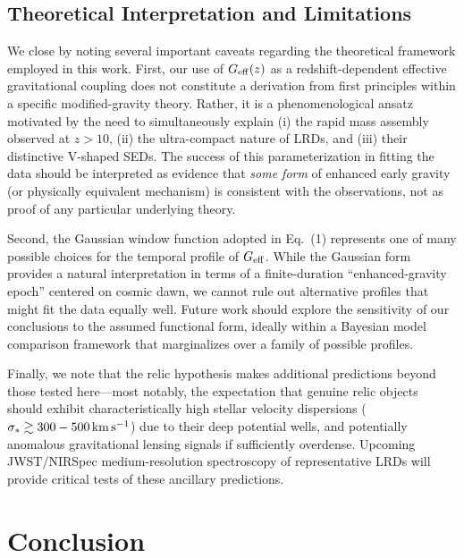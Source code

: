\documentclass[twocolumn]{aastex631}
\begin{document}
\subsection{Theoretical Interpretation and Limitations}

We close by noting several important caveats regarding the theoretical framework employed in this work. First, our use of $G_{\rm eff}(z)$ as a redshift-dependent effective gravitational coupling does not constitute a derivation from first principles within a specific modified-gravity theory. Rather, it is a phenomenological ansatz motivated by the need to simultaneously explain (i) the rapid mass assembly observed at $z > 10$, (ii) the ultra-compact nature of LRDs, and (iii) their distinctive V-shaped SEDs. The success of this parameterization in fitting the data should be interpreted as evidence that \textit{some form} of enhanced early gravity (or physically equivalent mechanism) is consistent with the observations, not as proof of any particular underlying theory.

Second, the Gaussian window function adopted in Eq.~(1) represents one of many possible choices for the temporal profile of $G_{\rm eff}$. While the Gaussian form provides a natural interpretation in terms of a finite-duration ``enhanced-gravity epoch'' centered on cosmic dawn, we cannot rule out alternative profiles that might fit the data equally well. Future work should explore the sensitivity of our conclusions to the assumed functional form, ideally within a Bayesian model comparison framework that marginalizes over a family of possible profiles.

Finally, we note that the relic hypothesis makes additional predictions beyond those tested here---most notably, the expectation that genuine relic objects should exhibit characteristically high stellar velocity dispersions ($\sigma_* \gtrsim 300-500\rm\,km\,s^{-1}$) due to their deep potential wells, and potentially anomalous gravitational lensing signals if sufficiently overdense. Upcoming JWST/NIRSpec medium-resolution spectroscopy of representative LRDs will provide critical tests of these ancillary predictions.

\section{Conclusion} \label{sec:conclusion}
\end{document}
